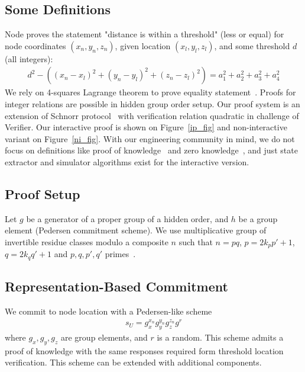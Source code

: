 \documentclass{article}
\begin{document}
\subsection{Some Definitions}
\label{sect-definitions}
Node proves the statement "distance is within a threshold" (less or equal)
for node coordinates $(x_n, y_n, z_n)$,
given location $(x_l, y_l, z_l)$,
and some threshold $d$ (all integers):
\begin{gather}
\label{eq-distn-cp}
  d^2 - ((x_n - x_l)^2 + (y_n - y_l)^2 + (z_n - z_l)^2) = a_1^2 + a_2^2 + a_3^2 + a_4^2
\end{gather}
We rely on 4-squares Lagrange theorem to prove equality statement~\cite{Lipmaa03}.
Proofs for integer relations are possible in hidden group order setup.
Our proof system is an extension of Schnorr protocol~\cite{Schnorr91}
with verification relation quadratic in challenge of Verifier.
Our interactive proof is shown on Figure~\ref{ip_fig}
and non-interactive variant on Figure~\ref{ni_fig}.
With our engineering community in mind, we do not focus on definitions like
proof of knowledge~\cite{BellarePoK}
and zero knowledge~\cite{Goldwasser85,GMW},
and just state extractor and simulator algorithms exist for the interactive version.

\subsection{Proof Setup}

Let $g$ be a generator of a proper group of a hidden order,
and $h$ be a group element (Pedersen commitment scheme).
We use multiplicative group of invertible residue classes modulo a composite $n$ such that
$n=pq$, $p=2 k_p p'+1$, $q=2 k_q q'+1$ and $p, q, p', q'$ primes~\cite{Idemix}.

\subsection{Representation-Based Commitment}
We commit to node location with a Pedersen-like scheme~\cite{PedersenCommit,BrandsPKIbook}
\begin{gather}
\label{cmt-up-cp}
  s_U = g_x^{x_n} g_y^{y_n} g_z^{z_n} g^{r}
\end{gather}
where $g_x, g_y, g_z$ are group elements, and $r$ is a random.
This scheme admits a proof of knowledge with the same responses required form threshold location verification.
This scheme can be extended with additional components. %
\end{document}
